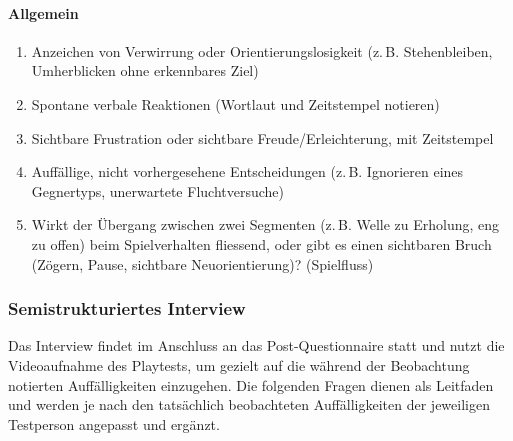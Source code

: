 \documentclass[../Main.tex]{subfiles}
\begin{document}
\begin{enumerate}[label=\textbf{Q\arabic*}, leftmargin=1.5cm, itemsep=0.5em]
\paragraph{Allgemein}
\begin{enumerate}[label=\textbf{B\arabic*}, leftmargin=1.5cm, itemsep=0.5em, resume]
    \item Anzeichen von Verwirrung oder Orientierungslosigkeit (z.\,B. Stehenbleiben, Umherblicken ohne erkennbares Ziel)
    \item Spontane verbale Reaktionen (Wortlaut und Zeitstempel notieren)
    \item Sichtbare Frustration oder sichtbare Freude/Erleichterung, mit Zeitstempel
    \item Auffällige, nicht vorhergesehene Entscheidungen (z.\,B. Ignorieren eines Gegnertyps, unerwartete Fluchtversuche)
    \item Wirkt der Übergang zwischen zwei Segmenten (z.\,B. Welle zu Erholung, eng zu offen) beim Spielverhalten fliessend, oder gibt es einen sichtbaren Bruch (Zögern, Pause, sichtbare Neuorientierung)? \hfill (Spielfluss)
\end{enumerate}

\subsubsection{Semistrukturiertes Interview}
 
Das Interview findet im Anschluss an das Post-Questionnaire statt und nutzt die Videoaufnahme des Playtests, um gezielt auf die während der Beobachtung notierten Auffälligkeiten einzugehen. Die folgenden Fragen dienen als Leitfaden und werden je nach den tatsächlich beobachteten Auffälligkeiten der jeweiligen Testperson angepasst und ergänzt.
 

\end{enumerate}
\end{document}
